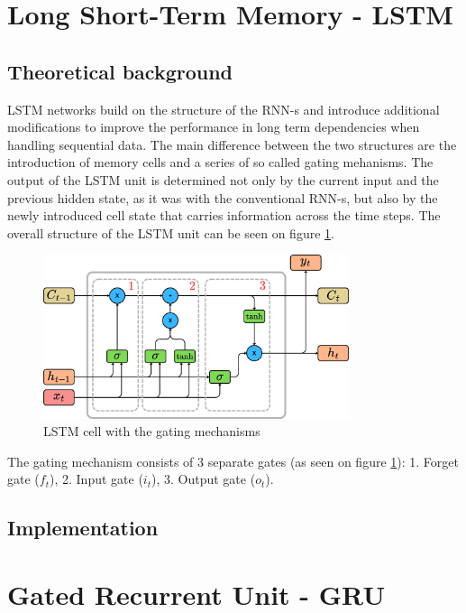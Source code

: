 \section{Long Short-Term Memory - LSTM}

\subsection{Theoretical background}

LSTM networks build on the structure of the RNN-s and introduce additional modifications to improve the performance in long term dependencies when handling sequential data. The main difference between the two structures are the introduction of memory cells and a series of so called gating mehanisms. The output of the LSTM unit is determined not only by the current input and the previous hidden state, as it was with the conventional RNN-s, but also by the newly introduced cell state that carries information across the time steps. The overall structure of the LSTM unit can be seen on figure \ref{fig:lstm_unit}.

\FloatBarrier
\begin{figure}[h]
    \centering
    \includegraphics[width=0.8\textwidth]{images/lstm_unit.pdf}
    \caption{LSTM cell with the gating mechanisms}
    \label{fig:lstm_unit}
\end{figure}
\FloatBarrier

The  gating mechanism consists of 3 separate gates (as seen on figure \ref{fig:lstm_unit}): 1. Forget gate ($f_t$), 2. Input gate ($i_t$), 3. Output gate ($o_t$). 

\subsection{Implementation}

\section{Gated Recurrent Unit - GRU}

